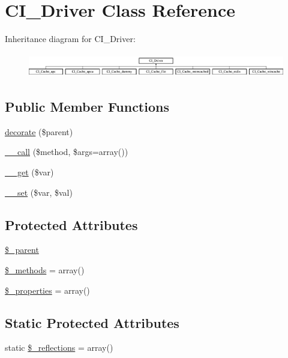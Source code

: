 \hypertarget{class_c_i___driver}{}\section{C\+I\+\_\+\+Driver Class Reference}
\label{class_c_i___driver}
Inheritance diagram for C\+I\+\_\+\+Driver\+:\begin{figure}[H]
\begin{center}
\leavevmode
\includegraphics[height=1.066667cm]{class_c_i___driver}
\end{center}
\end{figure}
\subsection*{Public Member Functions}
\begin{DoxyCompactItemize}
\item 
\mbox{\hyperlink{class_c_i___driver_acf6a5ad6a84d4c7a27f463cbb618004b}{decorate}} (\$parent)
\item 
\mbox{\hyperlink{class_c_i___driver_a57936fde7f1adea3f3e7dfca474a1786}{\+\_\+\+\_\+call}} (\$method, \$args=array())
\item 
\mbox{\hyperlink{class_c_i___driver_a8fb2d9cdca17b87400e780b9f9720933}{\+\_\+\+\_\+get}} (\$var)
\item 
\mbox{\hyperlink{class_c_i___driver_a921783e9d7c3fb79479375193c9f3d1e}{\+\_\+\+\_\+set}} (\$var, \$val)
\end{DoxyCompactItemize}
\subsection*{Protected Attributes}
\begin{DoxyCompactItemize}
\item 
\mbox{\hyperlink{class_c_i___driver_a8c040f02d9e695416231845d2aaf7f59}{\$\+\_\+parent}}
\item 
\mbox{\hyperlink{class_c_i___driver_a148e2042f169cec802078e58a46ace92}{\$\+\_\+methods}} = array()
\item 
\mbox{\hyperlink{class_c_i___driver_a677f712430f384ffa402fac50940ace4}{\$\+\_\+properties}} = array()
\end{DoxyCompactItemize}
\subsection*{Static Protected Attributes}
\begin{DoxyCompactItemize}
\item 
static \mbox{\hyperlink{class_c_i___driver_a3eae4dfd334261dd94fe0e148501513f}{\$\+\_\+reflections}} = array()
\end{DoxyCompactItemize}


